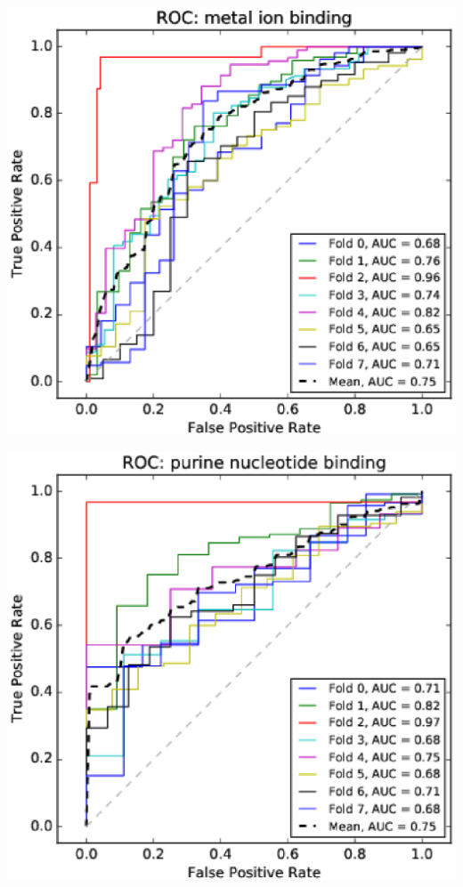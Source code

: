 \documentclass[11pt,twoside,a4paper]{book}
\newenvironment{Figure}
  {\par\medskip\noindent\minipage{\linewidth}}
  {\endminipage\par\medskip}
\begin{document}
\begin{multicols}{2}
\begin{Figure}\begin{center}\includegraphics[width=\linewidth]{figures/roc_metal_ion_binding}\label{fig:roc_metal_ion_binding}\end{center}\end{Figure}
\begin{Figure}\begin{center}\includegraphics[width=\linewidth]{figures/roc_purine_nucleotide_binding}\label{fig:roc_purine_nucleotide_binding}\end{center}\end{Figure}

\end{multicols}
\end{document}
